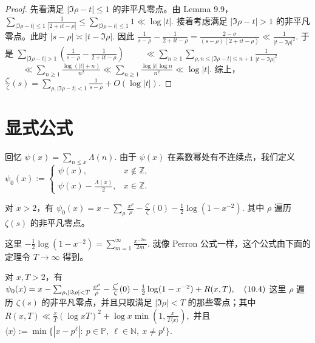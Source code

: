 \begin{proof}
		先看满足 $|\Im\rho-t|\leq1$ 的非平凡零点。由 Lemma 9.9，
	\(\textstyle \sum_{|\Im\rho-t|\leq1}\frac1{|2+\allowbreak{}it-\rho|} \leq\allowbreak{} \sum_{|\Im\rho-t|\leq1}1 \ll\allowbreak{} \log |t|.\)
		接着考虑满足 $|\Im\rho-t|>1$ 的非平凡零点。此时
	\(\textstyle |s-\rho|\asymp\allowbreak{} |t-\Im\rho|.\)
	因此
	\(\textstyle \frac1{s-\rho} - \frac1{2+\allowbreak{}it-\rho} =\allowbreak{} \frac{2-\sigma}{(s-\rho)(2+\allowbreak{}it-\rho)} \ll\allowbreak{} \frac1{|t-\Im\rho|^2}.\)
	于是
	\(\textstyle \sum_{|\Im\rho-t|>1} \left( \frac1{s-\rho} - \frac1{2+\allowbreak{}it-\rho} \right)\) \(\textstyle \qquad\ll\allowbreak{} \sum_{n\geq1} \sum_{\rho,\allowbreak{} n\leq\allowbreak{} |\Im\rho-t|\leq\allowbreak{} n+\allowbreak{}1} \frac1{|t-\Im\rho|^2}\) \(\textstyle \qquad\ll\allowbreak{} \sum_{n\geq1}\frac{\log(|t|+\allowbreak{}n)}{n^2} \ll\allowbreak{} \sum_{n\geq1}\frac{\log |t|\log n}{n^2} \ll\allowbreak{} \log |t|.\)
	综上，
	\(\textstyle \frac{\zeta'}{\zeta}(s) =\allowbreak{} \sum_{\rho,\allowbreak{} |\Im\rho-t|<1} \frac1{s-\rho} +\allowbreak{} O(\log |t|).\)
\end{proof}

\section{显式公式}

回忆
\(\textstyle \psi(x)=\allowbreak{}\sum_{n\leq\allowbreak{} x}\Lambda(n).\)
由于 $\psi(x)$ 在素数幂处有不连续点，我们定义
\(\textstyle \psi_0(x) := \begin{cases} \psi(x), & x\notin\mathbb Z,\\ \psi(x)-\frac{\Lambda(x)}{2}, & x\in\mathbb Z. \end{cases}\)

\begin{theorem}
	对 $x>2$，有
	\(\textstyle \psi_0(x) =\allowbreak{} x - \sum_\rho \frac{x^\rho}{\rho} - \frac{\zeta'}{\zeta}(0) - \frac12\log(1-x^{-2}).\)
	其中 $\rho$ 遍历 $\zeta(s)$ 的非平凡零点。
\end{theorem}

这里
\(\textstyle -\frac12\log(1-x^{-2}) =\allowbreak{} \sum_{m=\allowbreak{}1}^{\infty}\frac{x^{-2m}}{2m}.\)
就像 Perron 公式一样，这个公式由下面的定理令 $T\to\infty$ 得到。

\begin{theorem}
	对 $x,T>2$，有
	\(\textstyle \psi_0(x) =\allowbreak{} x - \sum_{\rho,\allowbreak{} |\Im\rho|<T}\frac{x^\rho}{\rho} - \frac{\zeta'}{\zeta}(0) - \frac12\log(1-x^{-2}) +\allowbreak{} R(x,\allowbreak{}T),\allowbreak{} \quad\textup{(10.4)}\)
	这里 $\rho$ 遍历 $\zeta(s)$ 的非平凡零点，并且只取满足
	$|\Im\rho|<T$ 的那些零点；其中
	\(\textstyle R(x,\allowbreak{}T) \ll\allowbreak{} \frac{x}{T}(\log xT)^2 +\allowbreak{} \log x\min\left(1,\allowbreak{}\frac{x}{T\langle x\rangle}\right),\allowbreak{}\)
	并且
	\(\textstyle \langle x\rangle :=\allowbreak{} \min\{|x-p^\ell|:\ p\in\mathbb P,\allowbreak{}\ \ell\in\mathbb N,\allowbreak{}\ x\neq\allowbreak{} p^\ell\}.\)
\end{theorem}

